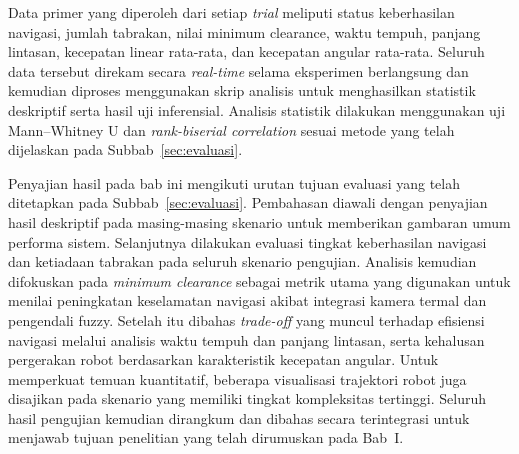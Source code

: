 Data primer yang diperoleh dari setiap \textit{trial} meliputi status keberhasilan navigasi, jumlah tabrakan, nilai minimum clearance, waktu tempuh, panjang lintasan, kecepatan linear rata-rata, dan kecepatan angular rata-rata. Seluruh data tersebut direkam secara \textit{real-time} selama eksperimen berlangsung dan kemudian diproses menggunakan skrip analisis untuk menghasilkan statistik deskriptif serta hasil uji inferensial. Analisis statistik dilakukan menggunakan uji Mann--Whitney U dan \textit{rank-biserial correlation} sesuai metode yang telah dijelaskan pada Subbab~\ref{sec:evaluasi}.

Penyajian hasil pada bab ini mengikuti urutan tujuan evaluasi yang telah ditetapkan pada Subbab~\ref{sec:evaluasi}. Pembahasan diawali dengan penyajian hasil deskriptif pada masing-masing skenario untuk memberikan gambaran umum performa sistem. Selanjutnya dilakukan evaluasi tingkat keberhasilan navigasi dan ketiadaan tabrakan pada seluruh skenario pengujian. Analisis kemudian difokuskan pada \textit{minimum clearance} sebagai metrik utama yang digunakan untuk menilai peningkatan keselamatan navigasi akibat integrasi kamera termal dan pengendali fuzzy. Setelah itu dibahas \textit{trade-off} yang muncul terhadap efisiensi navigasi melalui analisis waktu tempuh dan panjang lintasan, serta kehalusan pergerakan robot berdasarkan karakteristik kecepatan angular. Untuk memperkuat temuan kuantitatif, beberapa visualisasi trajektori robot juga disajikan pada skenario yang memiliki tingkat kompleksitas tertinggi. Seluruh hasil pengujian kemudian dirangkum dan dibahas secara terintegrasi untuk menjawab tujuan penelitian yang telah dirumuskan pada Bab~I.
